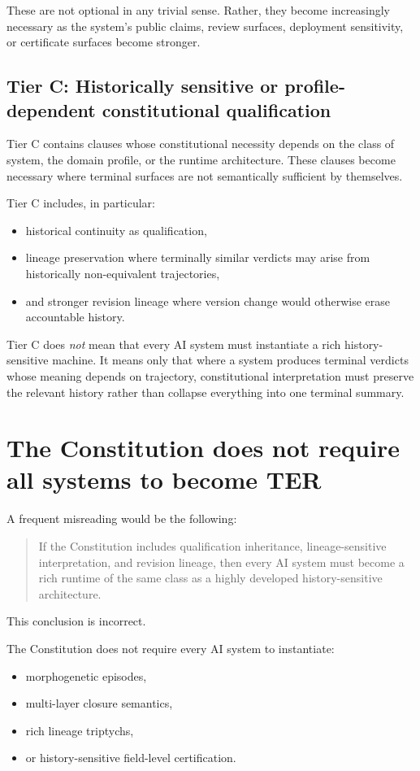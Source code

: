 \documentclass[11pt]{article}
\begin{document}
These are not optional in any trivial sense. Rather, they become increasingly necessary as the system's public claims, review surfaces, deployment sensitivity, or certificate surfaces become stronger.

\subsection{Tier C: Historically sensitive or profile-dependent constitutional qualification}

Tier C contains clauses whose constitutional necessity depends on the class of system, the domain profile, or the runtime architecture. These clauses become necessary where terminal surfaces are not semantically sufficient by themselves.

Tier C includes, in particular:
\begin{itemize}[leftmargin=2em]
    \item historical continuity as qualification,
    \item lineage preservation where terminally similar verdicts may arise from historically non-equivalent trajectories,
    \item and stronger revision lineage where version change would otherwise erase accountable history.
\end{itemize}

Tier C does \emph{not} mean that every AI system must instantiate a rich history-sensitive machine. It means only that where a system produces terminal verdicts whose meaning depends on trajectory, constitutional interpretation must preserve the relevant history rather than collapse everything into one terminal summary.

\section{The Constitution does not require all systems to become TER}

A frequent misreading would be the following:
\begin{quote}
If the Constitution includes qualification inheritance, lineage-sensitive interpretation, and revision lineage, then every AI system must become a rich runtime of the same class as a highly developed history-sensitive architecture.
\end{quote}

This conclusion is incorrect.

The Constitution does not require every AI system to instantiate:
\begin{itemize}[leftmargin=2em]
    \item morphogenetic episodes,
    \item multi-layer closure semantics,
    \item rich lineage triptychs,
    \item or history-sensitive field-level certification.
\end{itemize}
\end{document}
